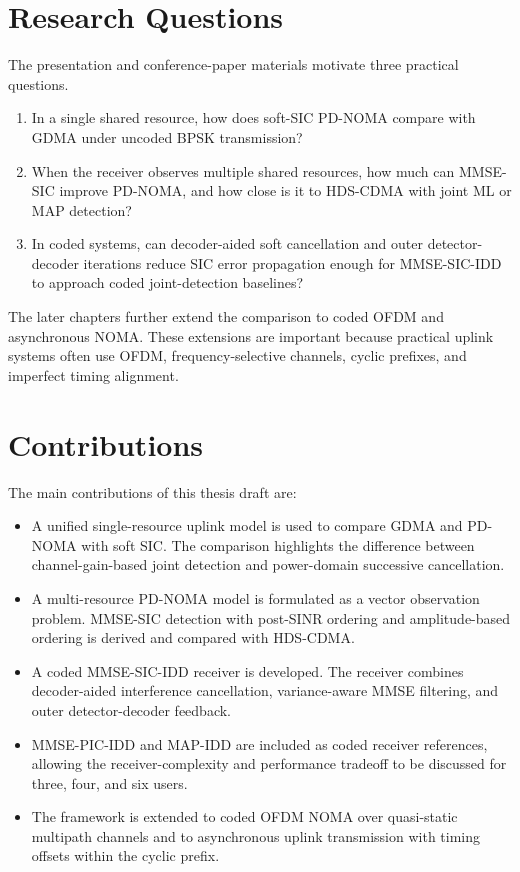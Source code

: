
\section{Research Questions}

The presentation and conference-paper materials motivate three practical questions.
\begin{enumerate}
    \item In a single shared resource, how does soft-SIC PD-NOMA compare with GDMA under uncoded BPSK transmission?
    \item When the receiver observes multiple shared resources, how much can MMSE-SIC improve PD-NOMA, and how close is it to HDS-CDMA with joint ML or MAP detection?
    \item In coded systems, can decoder-aided soft cancellation and outer detector-decoder iterations reduce SIC error propagation enough for MMSE-SIC-IDD to approach coded joint-detection baselines?
\end{enumerate}

The later chapters further extend the comparison to coded OFDM and asynchronous NOMA. These extensions are important because practical uplink systems often use OFDM, frequency-selective channels, cyclic prefixes, and imperfect timing alignment.

\section{Contributions}

The main contributions of this thesis draft are:
\begin{itemize}
    \item A unified single-resource uplink model is used to compare GDMA and PD-NOMA with soft SIC. The comparison highlights the difference between channel-gain-based joint detection and power-domain successive cancellation.
    \item A multi-resource PD-NOMA model is formulated as a vector observation problem. MMSE-SIC detection with post-SINR ordering and amplitude-based ordering is derived and compared with HDS-CDMA.
    \item A coded MMSE-SIC-IDD receiver is developed. The receiver combines decoder-aided interference cancellation, variance-aware MMSE filtering, and outer detector-decoder feedback.
    \item MMSE-PIC-IDD and MAP-IDD are included as coded receiver references, allowing the receiver-complexity and performance tradeoff to be discussed for three, four, and six users.
    \item The framework is extended to coded OFDM NOMA over quasi-static multipath channels and to asynchronous uplink transmission with timing offsets within the cyclic prefix.
\end{itemize}

